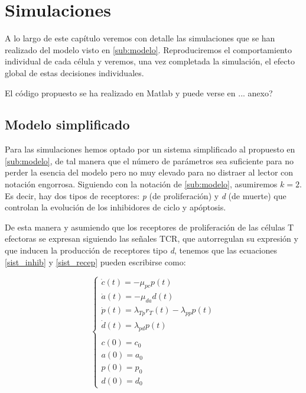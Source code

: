
\chapter{Simulaciones}
\label{cap:simulaciones}

A lo largo de este capítulo veremos con detalle las simulaciones que se han realizado del modelo visto en \ref{sub:modelo}. Reproduciremos el comportamiento individual de cada célula y veremos, una vez completada la simulación, el efecto global de estas decisiones individuales.

El código propuesto se ha realizado en Matlab y puede verse en ... anexo? 


\section{Modelo simplificado}

Para las simulaciones hemos optado por un sistema simplificado al propuesto en \ref{sub:modelo}, de tal manera que el número de parámetros sea suficiente para no perder la esencia del modelo pero no muy elevado para no distraer al lector con notación engorrosa. Siguiendo con la notación de \ref{sub:modelo}, asumiremos $k=2$. Es decir, hay dos tipos de receptores: \textit{p} (de proliferación) y \textit{d} (de muerte) que controlan
la evolución de los inhibidores de ciclo y apóptosis.

De esta manera y asumiendo que los receptores de proliferación de las células T efectoras se expresan siguiendo las señales TCR, que autorregulan su expresión y que inducen la producción de receptores tipo \textit{d}, tenemos que las ecuaciones \ref{sist_inhib} y \ref{sist_recep} pueden escribirse como:

\begin{equation}
	\label{sist9_simplif}
	\left\{ \begin{array}{l}
	\dot{c}(t) = -\mu_{pc}p(t) \\
	\dot{a}(t) = -\mu_{da}d(t)  \\
	\dot{p}(t) = \lambda_{Tp}r_{T}(t) - \lambda_{pp}p(t) \\
	\dot{d}(t) = \lambda_{pd}p(t) \\
	\\
	c(0)=c_0 \\
	a(0)=a_0 \\
	p(0)=p_0 \\
	d(0)=d_0 
	\end{array}
	\right.
\end{equation}

